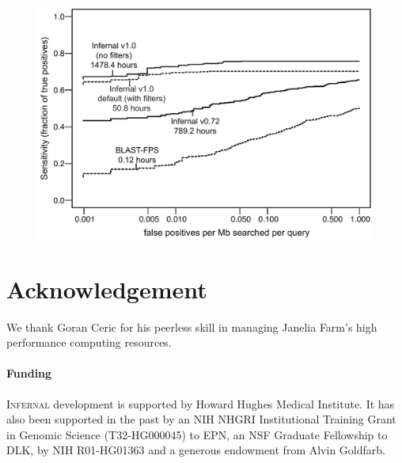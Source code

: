 \documentclass{bioinfo}
\begin{document}
\begin{application}
\begin{figure}[!tpb]
\centerline{\includegraphics[scale=0.33]{figs/roc}}

\label{Fig:01}
\end{figure}

\section*{Acknowledgement}

We thank Goran Ceric for his peerless skill in managing Janelia Farm's
high performance computing resources.

\paragraph{Funding\textcolon} 
\textsc{Infernal} development is supported by Howard Hughes Medical
Institute. It has also been supported in the past by an NIH NHGRI
Institutional Training Grant in Genomic Science (T32-HG000045) to EPN,
an NSF Graduate Fellowship to DLK, by NIH R01-HG01363 and a
generous endowment from Alvin Goldfarb. 

%
%

%


\end{application}
\end{document}
